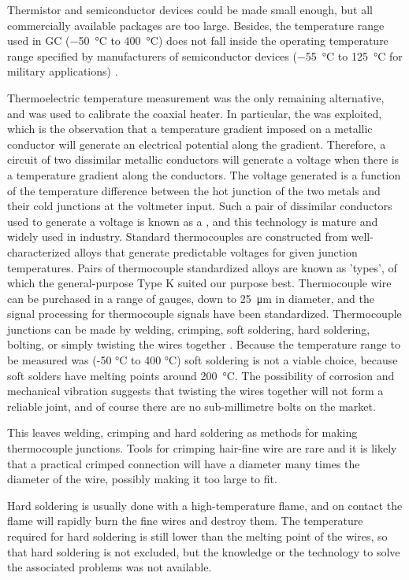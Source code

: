 Thermistor and semiconductor devices could be made small enough, but all
commercially available packages are too large. Besides, the temperature range
used in GC (\SI{-50}{\celsius} to \SI{400}{\celsius}) does not fall inside the
operating temperature range specified by manufacturers of semiconductor devices
(\SI{-55}{\celsius} to \SI{125}{\celsius} for military applications)
\autocite{nullD1996}.

Thermoelectric temperature measurement was the only remaining alternative, and
was used to calibrate the coaxial heater. In particular, the  was exploited, which is the observation that a temperature gradient
imposed on a metallic conductor will generate an electrical potential along the
gradient. Therefore, a circuit of two dissimilar metallic conductors will
generate a voltage when there is a temperature gradient along the conductors.
The voltage generated is a function of the temperature difference between the
hot junction of the two metals and their cold junctions at the voltmeter input.
Such a pair of dissimilar conductors used to generate a voltage is known as a
, and this technology is mature and widely used in
industry. Standard thermocouples are constructed from well-characterized alloys
that generate predictable voltages for given junction temperatures. Pairs of
thermocouple standardized alloys are known as 'types', of which the
general-purpose Type K suited our purpose best. Thermocouple wire can be
purchased in a range of gauges, down to \SI{25}{\micro\metre} in diameter, and
the signal processing for thermocouple signals have been standardized.
Thermocouple junctions can be made by welding, crimping, soft soldering, hard
soldering, bolting, or simply twisting the wires together \autocite{McGee1988}.
Because the temperature range to be measured was ({-}50 \si{\celsius} to 400
\si{\celsius}) soft soldering is not a viable choice, because soft solders have
melting points around \SI{200}{\celsius}. The possibility of corrosion and
mechanical vibration suggests that twisting the wires together will not form a
reliable joint, and of course there are no sub-millimetre bolts on the market.

This leaves welding, crimping and hard soldering as methods for making
thermocouple junctions. Tools for crimping hair-fine wire are rare and it is
likely that a practical crimped connection will have a diameter many times the
diameter of the wire, possibly making it too large to fit.

Hard soldering is usually done with a high-temperature flame, and on contact the
flame will rapidly burn the fine wires and destroy them. The temperature
required for hard soldering is still lower than the melting point of the wires,
so that hard soldering is not excluded, but the knowledge or the technology to
solve the associated problems was not available.

